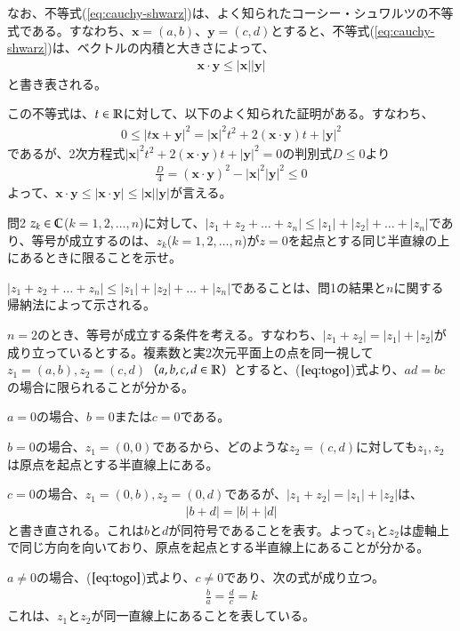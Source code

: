 なお、不等式(\ref{eq:cauchy-shwarz})は、よく知られたコーシー・シュワルツの不等式である。すなわち、$\bm{x}=(a,b)$、$\bm{y}=(c,d)$とすると、不等式(\ref{eq:cauchy-shwarz})は、ベクトルの内積と大きさによって、
\begin{align}
    \bm{x}\cdot \bm{y}\le|\bm{x}||\bm{y}|\label{eq:cauchy-shwarz0}
\end{align}
と書き表される。

この不等式は、$t\in\mathbb{R}$に対して、以下のよく知られた証明がある。すなわち、
\begin{align*}
    0\le|t\bm{x}+\bm{y}|^2
    =|\bm{x}|^2t^2+2(\bm{x}\cdot\bm{y})t+|\bm{y}|^2
\end{align*}
であるが、2次方程式$|\bm{x}|^2t^2+2(\bm{x}\cdot\bm{y})t+|\bm{y}|^2=0$の判別式$D\le 0$より
\begin{align*}
    \frac{D}{4}=(\bm{x}\cdot\bm{y})^2-|\bm{x}|^2|\bm{y}|^2\le 0
\end{align*}
よって、$\bm{x}\cdot\bm{y}\le|\bm{x}\cdot\bm{y}|\le|\bm{x}||\bm{y}|$が言える。

\begin{mysimplebox}{問2}
    $z_k\in\mathbb{C}$($k=1,2,\dots,n$)に対して、$|z_1+z_2+\dots+z_n|\le|z_1|+|z_2|+\dots+|z_n|$であり、等号が成立するのは、$z_k$($k=1,2,\dots,n$)が$z=0$を起点とする同じ半直線の上にあるときに限ることを示せ。
\end{mysimplebox}

$|z_1+z_2+\dots+z_n|\le|z_1|+|z_2|+\dots+|z_n|$であることは、問1の結果と$n$に関する帰納法によって示される。

$n=2$のとき、等号が成立する条件を考える。すなわち、$|z_1+z_2|=|z_1|+|z_2|$が成り立っているとする。複素数と実2次元平面上の点を同一視して$z_1=(a,b), z_2=(c,d)$（$a,b,c,d\in\mathbb{R}$）とすると、($\ref{eq:togo}$)式より、$ad=bc$の場合に限られることが分かる。

$a=0$の場合、$b=0$または$c=0$である。

$b=0$の場合、$z_1=(0,0)$であるから、どのような$z_2=(c,d)$に対しても$z_1, z_2$は原点を起点とする半直線上にある。

$c=0$の場合、$z_1=(0,b), z_2=(0,d)$であるが、$|z_1+z_2|=|z_1|+|z_2|$は、
\begin{align*}
    |b+d|=|b|+|d|
\end{align*}
と書き直される。これは$b$と$d$が同符号であることを表す。よって$z_1$と$z_2$は虚軸上で同じ方向を向いており、原点を起点とする半直線上にあることが分かる。

$a\neq 0$の場合、($\ref{eq:togo}$)式より、$c\neq 0$であり、次の式が成り立つ。
\begin{align*}
    \frac{b}{a}=\frac{d}{c}=k
\end{align*}
これは、$z_1$と$z_2$が同一直線上にあることを表している。


